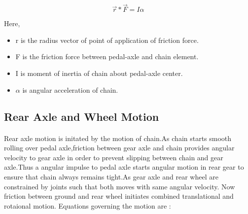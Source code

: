 \documentclass[11pt]{article}
\begin{document}
\begin{equation}
		\vec{r} * \vec{F} = I \alpha
\end{equation}

Here, 	
\begin{itemize}
\item r is the radius vector of point of application of friction force.
\item F is the friction force between pedal-axle and chain element.
\item I is moment of inertia of chain about pedal-axle center.
\item $\alpha$ is angular acceleration of chain.
\end{itemize}

 
\subsection{Rear Axle and Wheel Motion}
\paragraph{}

	Rear axle motion is initated by the motion of chain.As chain starts smooth rolling over pedal axle,friction between gear axle and
	chain provides angular velocity to gear axle in order to prevent slipping between chain and gear axle.Thus a angular impulse to pedal 
	axle starts angular motion in rear gear to ensure that chain always remains tight.As gear axle and rear wheel are constrained by joints
	such that both moves with same angular velocity. Now friction between ground and rear wheel initiates combined translational and 
	rotaional motion. Equations governing the motion are :
	
\end{document}

